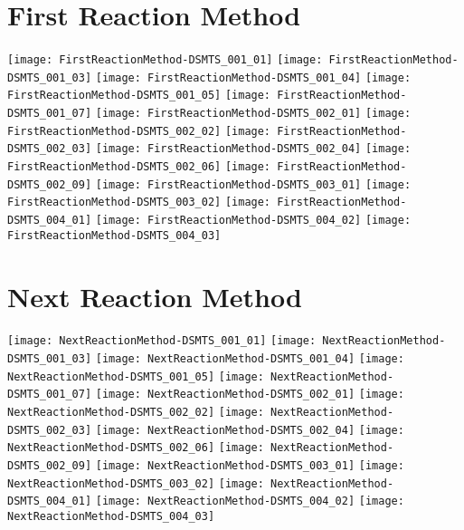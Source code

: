 \documentclass[notitlepage]{revtex4-1}
\begin{document}
\section{First Reaction Method}
\texttt{[image: FirstReactionMethod-DSMTS\_001\_01]}
\texttt{[image: FirstReactionMethod-DSMTS\_001\_03]}
\texttt{[image: FirstReactionMethod-DSMTS\_001\_04]}
\texttt{[image: FirstReactionMethod-DSMTS\_001\_05]}
\texttt{[image: FirstReactionMethod-DSMTS\_001\_07]}
\texttt{[image: FirstReactionMethod-DSMTS\_002\_01]}
\texttt{[image: FirstReactionMethod-DSMTS\_002\_02]}
\texttt{[image: FirstReactionMethod-DSMTS\_002\_03]}
\texttt{[image: FirstReactionMethod-DSMTS\_002\_04]}
\texttt{[image: FirstReactionMethod-DSMTS\_002\_06]}
\texttt{[image: FirstReactionMethod-DSMTS\_002\_09]}
\texttt{[image: FirstReactionMethod-DSMTS\_003\_01]}
\texttt{[image: FirstReactionMethod-DSMTS\_003\_02]}
\texttt{[image: FirstReactionMethod-DSMTS\_004\_01]}
\texttt{[image: FirstReactionMethod-DSMTS\_004\_02]}
\texttt{[image: FirstReactionMethod-DSMTS\_004\_03]}

\section{Next Reaction Method}
\texttt{[image: NextReactionMethod-DSMTS\_001\_01]}
\texttt{[image: NextReactionMethod-DSMTS\_001\_03]}
\texttt{[image: NextReactionMethod-DSMTS\_001\_04]}
\texttt{[image: NextReactionMethod-DSMTS\_001\_05]}
\texttt{[image: NextReactionMethod-DSMTS\_001\_07]}
\texttt{[image: NextReactionMethod-DSMTS\_002\_01]}
\texttt{[image: NextReactionMethod-DSMTS\_002\_02]}
\texttt{[image: NextReactionMethod-DSMTS\_002\_03]}
\texttt{[image: NextReactionMethod-DSMTS\_002\_04]}
\texttt{[image: NextReactionMethod-DSMTS\_002\_06]}
\texttt{[image: NextReactionMethod-DSMTS\_002\_09]}
\texttt{[image: NextReactionMethod-DSMTS\_003\_01]}
\texttt{[image: NextReactionMethod-DSMTS\_003\_02]}
\texttt{[image: NextReactionMethod-DSMTS\_004\_01]}
\texttt{[image: NextReactionMethod-DSMTS\_004\_02]}
\texttt{[image: NextReactionMethod-DSMTS\_004\_03]}
\end{document}
